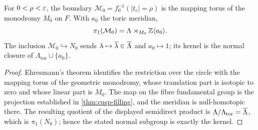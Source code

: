 \begin{proposition}\label{prop:cusp-boundary}
For $0<\rho<\varepsilon$, the boundary
$\mathcal M_0=f_0^{-1}(|t_c|=\rho)$ is the mapping torus of the monodromy
$M_0$ on $F$.  With $a_0$ the toric meridian,
\[
 \pi_1(\mathcal M_0)=\Lambda\rtimes_{M_0}\mathbb Z\langle a_0\rangle.
\]
The inclusion $\mathcal M_0\hookrightarrow N_0$ sends
$\lambda\mapsto\overline\lambda\in\overline\Lambda$ and $a_0\mapsto1$; its
kernel is the normal closure of
$\Lambda_{\mathrm{tor}}\cup\{a_0\}$.
\end{proposition}

\begin{proof}
Ehresmann's theorem identifies the restriction over the circle with the
mapping torus of the geometric monodromy, whose translation part is
isotopic to zero and whose linear part is $M_0$.  The map on the fibre
fundamental group is the projection established in
\cref{thm:cusp-filling}, and the meridian is null-homotopic there.  The
resulting quotient of the displayed semidirect product is
$\Lambda/\Lambda_{\mathrm{tor}}=\overline\Lambda$, which is
$\pi_1(N_0)$; hence the stated normal subgroup is exactly the kernel.
\end{proof}

